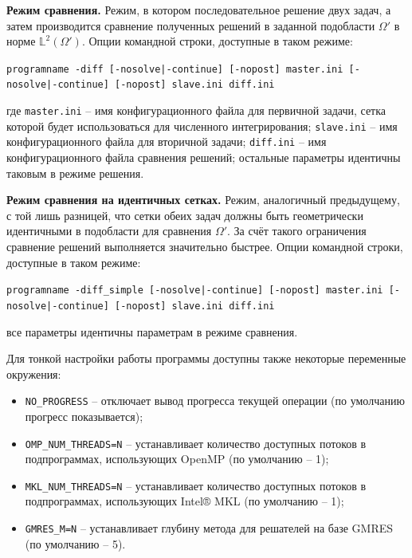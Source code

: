 \documentclass[a4paper,14pt]{article}
\newcommand{\CodeFont}[1]{{\small{\texttt{#1}}}}
\begin{document}
\textbf{Режим сравнения.} Режим, в котором последовательное решение двух задач, а затем производится сравнение полученных решений в заданной подобласти $\Omega'$ в норме $\mathbb{L}^{2}(\Omega')$. Опции командной строки, доступные в таком режиме:

\CodeFont{programname -diff [-nosolve|-continue] [-nopost] master.ini [-nosolve|-continue] [-nopost] slave.ini diff.ini}

\noindent где \CodeFont{master.ini} -- имя конфигурационного файла для первичной задачи, сетка которой будет использоваться для численного интегрирования; \CodeFont{slave.ini} -- имя конфигурационного файла для вторичной задачи; \CodeFont{diff.ini} -- имя конфигурационного файла сравнения решений; остальные параметры идентичны таковым в режиме решения.

\textbf{Режим сравнения на идентичных сетках.} Режим, аналогичный предыдущему, с той лишь разницей, что сетки обеих задач должны быть геометрически идентичными в подобласти для сравнения $\Omega'$. За счёт такого ограничения сравнение решений выполняется значительно быстрее. Опции командной строки, доступные в таком режиме:

\CodeFont{programname -diff\_simple [-nosolve|-continue] [-nopost] master.ini [-nosolve|-continue] [-nopost] slave.ini diff.ini}

\noindent все параметры идентичны параметрам в режиме сравнения.

Для тонкой настройки работы программы доступны также некоторые переменные окружения:
\begin{itemize}
	\item \CodeFont{NO\_PROGRESS} -- отключает вывод прогресса текущей операции (по умолчанию прогресс показывается);
	\item \CodeFont{OMP\_NUM\_THREADS=N} -- устанавливает количество доступных потоков в подпрограммах, использующих OpenMP (по умолчанию -- 1);
	\item \CodeFont{MKL\_NUM\_THREADS=N} -- устанавливает количество доступных потоков в подпрограммах, использующих Intel® MKL (по умолчанию -- 1);
	\item \CodeFont{GMRES\_M=N} -- устанавливает глубину метода для решателей на базе GMRES (по умолчанию -- 5).
\end{itemize}
\end{document}
